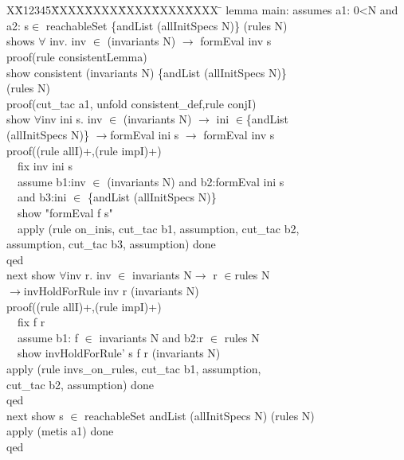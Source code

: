 \documentclass[final]{IEEEtran}
\newlength{\fminilength}
\newenvironment{fmini}[1][\linewidth]
  {\setlength{\fminilength}{#1\fboxsep-2\fboxrule}%
   \vspace{2ex}\noindent\begin{lrbox}{\fminibox}\begin{minipage}{\fminilength}%
   \mbox{ }\hfill\vspace{-2.5ex}}%
  {\end{minipage}\end{lrbox}\vspace{1ex}\hspace{0ex}%
   \framebox{\usebox{\fminibox}}}
\newenvironment{specification}
{\noindent\scriptsize
\tt\begin{fmini}\begin{tabbing}X\=X12345\=XXXX\=XXXX\=XXXX\=XXXX\=XXXX
\=\+\kill} {\end{tabbing}\normalfont\end{fmini}}
\def \twoSpaces {\ \ }
\begin{document}
{\begin{specification}
lemma main:
  assumes  a1: 0<N and \\
  a2: s$\in$ reachableSet \{andList (allInitSpecs N)\} (rules N)\\
  shows $\forall$ inv. inv $\in$ (invariants N) $\longrightarrow$ formEval inv s\\
proof(rule consistentLemma)\\
  show consistent (invariants N) \{andList (allInitSpecs N)\}\\ (rules N)\\
 proof(cut\_tac a1, unfold consistent\_def,rule conjI)\\
   show  $\forall$inv ini s. inv $\in$ (invariants N)
$\longrightarrow$ ini $\in$\{andList \\
(allInitSpecs N)\} $\longrightarrow$formEval ini s $\longrightarrow$ formEval inv s\\
proof((rule allI)+,(rule impI)+)\\
\twoSpaces   fix inv ini s\\
\twoSpaces   assume b1:inv $\in$ (invariants N) and b2:formEval ini s\\
\twoSpaces     and b3:ini $\in$ \{andList (allInitSpecs N)\}  \\
\twoSpaces   show "formEval f s"\\
\twoSpaces   apply (rule on\_inis, cut\_tac b1, assumption, cut\_tac b2, \\
assumption, cut\_tac b3, assumption) done\\
    qed\\

next   show  $\forall$inv r. inv $\in$ invariants N$\longrightarrow$
 r $\in$rules N\\
 $\longrightarrow$invHoldForRule inv r (invariants N) \\

   proof((rule allI)+,(rule impI)+)\\
\twoSpaces      fix f r \\
\twoSpaces         assume b1: f $\in$ invariants N  and b2:r $\in$ rules N\\

\twoSpaces     show invHoldForRule' s f r (invariants N)\\
  apply (rule invs\_on\_rules, cut\_tac b1, assumption, \\
  cut\_tac b2, assumption) done\\
qed\\
next show s $\in$ reachableSet {andList (allInitSpecs N)} (rules N)\\
  apply (metis a1) done\\
qed\\
\end{specification}

}
\end{document}
